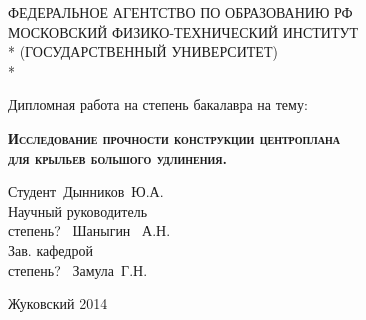 \begin{titlepage}
\newpage		

\begin{center}
ФЕДЕРАЛЬНОЕ АГЕНТСТВО ПО ОБРАЗОВАНИЮ РФ \\
\vspace{1cm}
МОСКОВСКИЙ ФИЗИКО-ТЕХНИЧЕСКИЙ ИНСТИТУТ \\*
(ГОСУДАРСТВЕННЫЙ УНИВЕРСИТЕТ) \\*
\hrulefill
\end{center}
 
\vspace{8em}

\begin{center}
\Large Дипломная работа на степень бакалавра на тему:
\end{center}

\vspace{2.5em}
 
\begin{center}
\textsc{\textbf{Исследование прочности конструкции центроплана \\ для крыльев большого удлинения.}}
\end{center}

\vspace{6em}
 
\begin{flushleft}
Студент\hrulefill ~Дынников~Ю.А. \\
\vspace{1.5em}
Научный руководитель \\
степень? \hrulefill ~Шаныгин~ А.Н.\\
\vspace{1.5em}
\vspace{1.5em}
Зав. кафедрой\\
степень? \hrulefill ~Замула~Г.Н.
\end{flushleft}
 
\vspace{\fill}

\begin{center}
Жуковский 2014
\end{center}

\end{titlepage}
